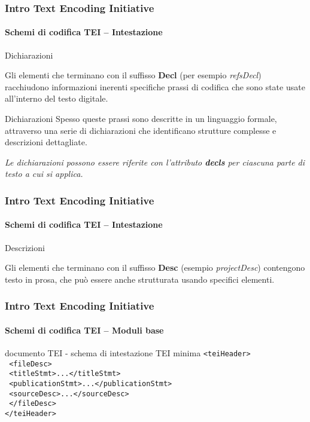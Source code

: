\begin{frame}
	\frametitle{Intro Text Encoding Initiative}
	\framesubtitle{Schemi di codifica TEI – Intestazione}
	\addtocounter{nframe}{1}

    \begin{block}{Dichiarazioni}
        
        Gli elementi che terminano con il suffisso \textbf{Decl} (per esempio \textit{refsDecl}) racchiudono informazioni inerenti specifiche prassi di codifica che sono state usate all'interno del testo digitale.
    \end{block}

    \begin{block}{Dichiarazioni}
        Spesso queste prassi sono descritte in un linguaggio formale, attraverso una serie di dichiarazioni che identificano strutture complesse e descrizioni dettagliate.
    \end{block}

    \textit{Le dichiarazioni possono essere riferite con l'attributo \textbf{decls} per ciascuna parte di testo a cui si applica.}
\textit{}

\end{frame}


\begin{frame}
	\frametitle{Intro Text Encoding Initiative}
	\framesubtitle{Schemi di codifica TEI – Intestazione}
	\addtocounter{nframe}{1}

    \begin{block}{Descrizioni}

        Gli elementi che terminano con il suffisso \textbf{Desc} (esempio \textit{projectDesc}) contengono testo in prosa, che può essere anche strutturata usando specifici elementi.

    \end{block}
\textit{}

\end{frame}


\begin{frame}
	\frametitle{Intro Text Encoding Initiative}
	\framesubtitle{Schemi di codifica TEI – Moduli base}
	\addtocounter{nframe}{1}

	\begin{block}{documento TEI - schema di intestazione TEI minima}
        \texttt{<teiHeader>}
        \\\texttt{ <fileDesc>}
        \\\texttt{  <titleStmt>...</titleStmt>}
        \\\texttt{  <publicationStmt>...</publicationStmt>}
        \\\texttt{  <sourceDesc>...</sourceDesc>}
        \\\texttt{ </fileDesc>}
        \\\texttt{</teiHeader>}
    \end{block}
    

\end{frame}


